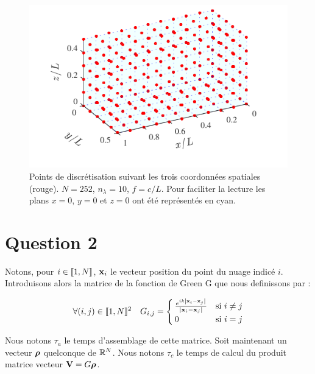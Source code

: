 \documentclass[10pt]{article}
\begin{document}
\begin{multicols}{2}
\begin{figure}[H]
  \begin{center}
  \includegraphics[width=0.95\columnwidth]{Q1_4.pdf}
  \vspace*{-11pt}
  \caption{Points de discrétisation suivant les trois coordonnées spatiales (rouge). $N=252$, $n_\lambda = 10$, $f = c/L$. Pour faciliter la lecture les plans $x=0$, $y=0$ et $z=0$ ont été représentés en cyan.}
  \label{fig:Q1}
  \end{center}
\end{figure}
\vspace*{-22pt}


\vspace*{22pt}



\section*{Question 2}

Notons, pour $i \in  \llbracket 1,N \rrbracket $, ${\bf x}_i$ le vecteur position du point du nuage indicé $i$. Introduisons alors la matrice de la fonction de Green G que nous definissons par :

\begin{equation}
\forall (i,j) \in  \llbracket 1,N \rrbracket ^{2} \quad G_{i,j} =
 \begin{cases}
   \frac{e^{ik\left| {\bf x}_i - {\bf x}_j \right|}}{\left| {\bf x}_i - {\bf x}_j \right|} & \text{si } i\neq j \\
   0 & \text{si } i=j
 \end{cases}
\end{equation}


Nous notons $\tau_{a}$ le temps d'assemblage de cette matrice. Soit maintenant un vecteur ${\boldsymbol{\rho}}$ quelconque de $\mathbb{R}^{N}$. Nous notons $\tau_c$ le temps de calcul du produit matrice vecteur ${\bf V} = G{\boldsymbol{\rho}}$.\\


\end{multicols}
\end{document}
